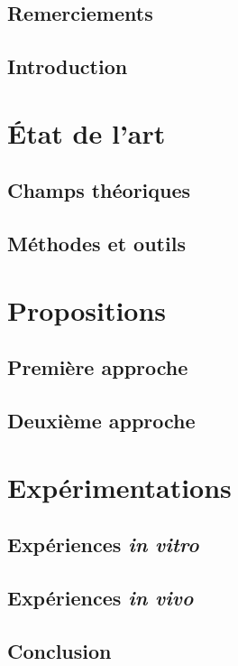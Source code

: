 \documentclass[12pt, french, fancyChapter, fancyPart, squeezeCommittee]{these-LUNAM}
\begin{document}

\chapter*{Remerciements}

\lipsum[1-2]

\chapter{Introduction}

\lipsum[1-6]

\part{État de l'art}

\chapter{Champs théoriques}

\lipsum[8-13]

\chapter{Méthodes et outils}

\lipsum[10-13]

\part{Propositions}

\chapter{Première approche}

\lipsum[17-21]

\chapter{Deuxième approche}

\lipsum[23-30]

\part{Expérimentations}

\chapter{Expériences \emph{in vitro}}

\lipsum[13-18]

\chapter{Expériences \emph{in vivo}}

\lipsum[22-32]

\chapter{Conclusion}


\lipsum[7-9]

\backmatter

\tableofcontents
\listoftables
\listoffigures
\end{document}
